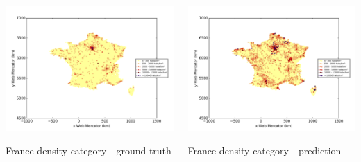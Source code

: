 \documentclass[c]{beamer}
\begin{document}
\begin{frame}
\begin{columns}
 \begin{column}{0.5\textwidth}
  \begin{overlayarea}{\linewidth}{4cm}
    \centering\vfill
    \includegraphics[scale=0.50]{images/France/density_ground_truth.png}
  \end{overlayarea}
  \begin{overlayarea}{\linewidth}{0.5cm}
    \centering
    \tiny France density category - ground truth\par
  \end{overlayarea}
 \end{column}
 \begin{column}{0.5\textwidth}
  \begin{overlayarea}{\linewidth}{4cm}
    \centering\vfill
    \includegraphics[scale=0.50]{images/France/nn/density_classification.png}
  \end{overlayarea}
  \begin{overlayarea}{\linewidth}{0.5cm}
    \centering
    \tiny France density category - prediction\par
  \end{overlayarea}
 \end{column}
\end{columns}


\end{frame}
\end{document}
